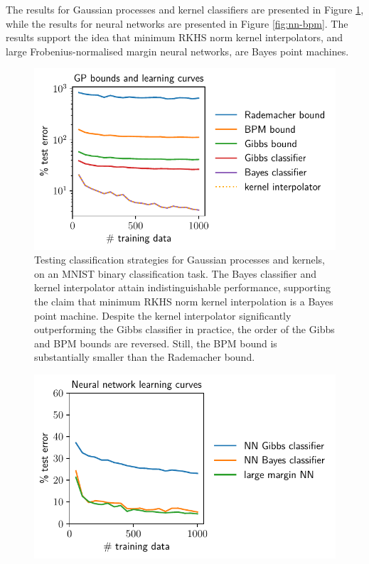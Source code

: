 \begin{refsection}
The results for Gaussian processes and kernel classifiers are presented in
Figure \ref{fig:k-bpm}, while the results for neural networks are presented in Figure \ref{fig:nn-bpm}. The results support the idea that minimum RKHS norm kernel interpolators, and large Frobenius-normalised margin neural networks, are Bayes point machines.

\begin{figure}[p]
    \centering
    \includegraphics{figures/gp.pdf}
    \caption[Testing classification strategies for Gaussian processes and kernels]{Testing classification strategies for Gaussian processes and kernels, on an MNIST \citep{lecun2010mnist} binary classification task. The Bayes classifier and kernel interpolator attain indistinguishable performance, supporting the claim that minimum RKHS norm kernel interpolation is a Bayes point machine. Despite the kernel interpolator significantly outperforming the Gibbs classifier in practice, the order of the Gibbs and BPM bounds are reversed. Still, the BPM bound is substantially smaller than the Rademacher bound.}
    \label{fig:k-bpm}
\end{figure}
\begin{figure}[p]
    \centering
    \hspace{.25em}\includegraphics{figures/nn.pdf}

\end{figure}
\end{refsection}
